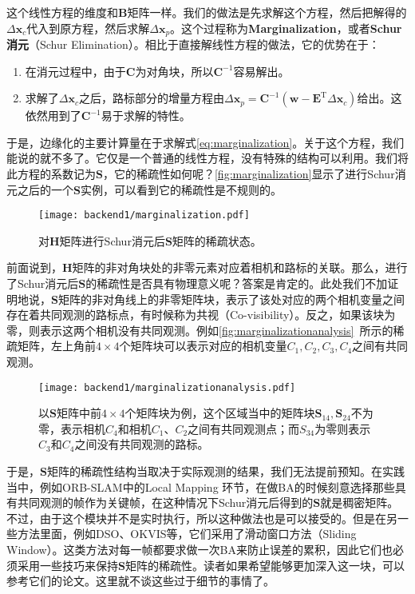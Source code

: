 这个线性方程的维度和$\bm{B}$矩阵一样。我们的做法是先求解这个方程，然后把解得的$\Delta \bm{x}_c$代入到原方程，然后求解$\Delta \bm{x}_p$。这个过程称为\textbf{Marginalization}\textsuperscript{\cite{Sibley2010}}，或者\textbf{Schur消元}（Schur Elimination）。相比于直接解线性方程的做法，它的优势在于：

\begin{enumerate}
	\item 在消元过程中，由于$\bm{C}$为对角块，所以$\bm{C}^{-1}$容易解出。
	\item 求解了$\Delta \bm{x}_c$之后，路标部分的增量方程由$\Delta \bm{x}_p = \bm{C}^{-1} (\bm{w} - \bm{E}^\mathrm{T} \Delta \bm{x}_c)$给出。这依然用到了$\bm{C}^{-1}$易于求解的特性。
\end{enumerate}

于是，边缘化的主要计算量在于求解式\eqref{eq:marginalization}。关于这个方程，我们能说的就不多了。它仅是一个普通的线性方程，没有特殊的结构可以利用。我们将此方程的系数记为$\bm{S}$，它的稀疏性如何呢？\autoref{fig:marginalization}显示了进行Schur消元之后的一个$\bm{S}$实例，可以看到它的稀疏性是不规则的。

\begin{figure}[!ht]
	\centering
	\texttt{[image: backend1/marginalization.pdf]}
	\caption{对$\bm{H}$矩阵进行Schur消元后$\bm{S}$矩阵的稀疏状态。}
	\label{fig:marginalization}
\end{figure}

前面说到，$\bm{H}$矩阵的非对角块处的非零元素对应着相机和路标的关联。那么，进行了Schur消元后$\bm{S}$的稀疏性是否具有物理意义呢？答案是肯定的。此处我们不加证明地说，$\bm{S}$矩阵的非对角线上的非零矩阵块，表示了该处对应的两个相机变量之间存在着共同观测的路标点，有时候称为共视（Co-visibility）。反之，如果该块为零，则表示这两个相机没有共同观测。例如\autoref{fig:marginalizationanalysis}~所示的稀疏矩阵，左上角前$4 \times 4$个矩阵块可以表示对应的相机变量$C_1,C_2,C_3,C_4$之间有共同观测。

\begin{figure}[!htp]
	\centering
	\texttt{[image: backend1/marginalizationanalysis.pdf]}
	\caption{以$\bm{S}$矩阵中前$4 \times 4$个矩阵块为例，这个区域当中的矩阵块$\bm{S}_{14}, \bm{S}_{24}$不为零，表示相机$C_4$和相机$C_1$、$C_2$之间有共同观测点；而$S_{34}$为零则表示$C_3$和$C_4$之间没有共同观测的路标。}
	\label{fig:marginalizationanalysis}
\end{figure}
\clearpage
于是，$\bm{S}$矩阵的稀疏性结构当取决于实际观测的结果，我们无法提前预知。在实践当中，例如ORB-SLAM\textsuperscript{\cite{Mur-Artal2015}}中的Local Mapping 环节，在做BA的时候刻意选择那些具有共同观测的帧作为关键帧，在这种情况下Schur消元后得到的$\bm{S}$就是稠密矩阵。不过，由于这个模块并不是实时执行，所以这种做法也是可以接受的。但是在另一些方法里面，例如DSO\textsuperscript{\cite{Engel2016}}、OKVIS\textsuperscript{\cite{Leutenegger2015}}等，它们采用了滑动窗口方法（Sliding Window）。这类方法对每一帧都要求做一次BA来防止误差的累积，因此它们也必须采用一些技巧来保持$\bm{S}$矩阵的稀疏性。读者如果希望能够更加深入这一块，可以参考它们的论文。这里就不谈这些过于细节的事情了。

